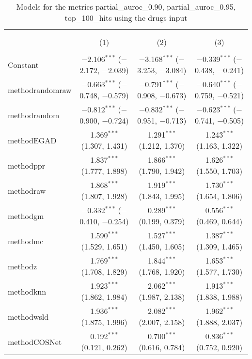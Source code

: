 
\begin{table}[!htbp] \centering 
  \caption{Models for the metrics partial_auroc_0.90, partial_auroc_0.95, top_100_hits using the drugs input} 
  \label{} 
\begin{tabular}{@{\extracolsep{5pt}}lccc} 
\\[-1.8ex]\hline 
\hline \\[-1.8ex] 
\\[-1.8ex] & (1) & (2) & (3)\\ 
\hline \\[-1.8ex] 
 Constant & $-$2.106$^{***}$ ($-$2.172, $-$2.039) & $-$3.168$^{***}$ ($-$3.253, $-$3.084) & $-$0.339$^{***}$ ($-$0.438, $-$0.241) \\ 
  methodrandomraw & $-$0.663$^{***}$ ($-$0.748, $-$0.579) & $-$0.791$^{***}$ ($-$0.908, $-$0.673) & $-$0.640$^{***}$ ($-$0.759, $-$0.521) \\ 
  methodrandom & $-$0.812$^{***}$ ($-$0.900, $-$0.724) & $-$0.832$^{***}$ ($-$0.951, $-$0.713) & $-$0.623$^{***}$ ($-$0.741, $-$0.505) \\ 
  methodEGAD & 1.369$^{***}$ (1.307, 1.431) & 1.291$^{***}$ (1.212, 1.370) & 1.243$^{***}$ (1.163, 1.322) \\ 
  methodppr & 1.837$^{***}$ (1.777, 1.898) & 1.866$^{***}$ (1.790, 1.942) & 1.626$^{***}$ (1.550, 1.703) \\ 
  methodraw & 1.868$^{***}$ (1.807, 1.928) & 1.919$^{***}$ (1.843, 1.995) & 1.730$^{***}$ (1.654, 1.806) \\ 
  methodgm & $-$0.332$^{***}$ ($-$0.410, $-$0.254) & 0.289$^{***}$ (0.199, 0.379) & 0.556$^{***}$ (0.469, 0.644) \\ 
  methodmc & 1.590$^{***}$ (1.529, 1.651) & 1.527$^{***}$ (1.450, 1.605) & 1.387$^{***}$ (1.309, 1.465) \\ 
  methodz & 1.769$^{***}$ (1.708, 1.829) & 1.844$^{***}$ (1.768, 1.920) & 1.653$^{***}$ (1.577, 1.730) \\ 
  methodknn & 1.923$^{***}$ (1.862, 1.984) & 2.062$^{***}$ (1.987, 2.138) & 1.913$^{***}$ (1.838, 1.988) \\ 
  methodwsld & 1.936$^{***}$ (1.875, 1.996) & 2.082$^{***}$ (2.007, 2.158) & 1.962$^{***}$ (1.888, 2.037) \\ 
  methodCOSNet & 0.192$^{***}$ (0.121, 0.262) & 0.700$^{***}$ (0.616, 0.784) & 0.836$^{***}$ (0.752, 0.920) \\ 

\end{tabular}
\end{table}
